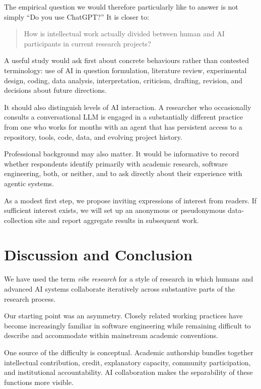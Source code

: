 The empirical question we would therefore particularly like to answer is not simply ``Do you use ChatGPT?'' It is closer to:

\begin{quote}
How is intellectual work actually divided between human and AI participants in current research projects?
\end{quote}

A useful study would ask first about concrete behaviours rather than contested terminology: use of AI in question formulation, literature review, experimental design, coding, data analysis, interpretation, criticism, drafting, revision, and decisions about future directions.

It should also distinguish levels of AI interaction. A researcher who occasionally consults a conversational LLM is engaged in a substantially different practice from one who works for months with an agent that has persistent access to a repository, tools, code, data, and evolving project history.

Professional background may also matter. It would be informative to record whether respondents identify primarily with academic research, software engineering, both, or neither, and to ask directly about their experience with agentic systems.

As a modest first step, we propose inviting expressions of interest from readers. If sufficient interest exists, we will set up an anonymous or pseudonymous data-collection site and report aggregate results in subsequent work.


\section{Discussion and Conclusion}

We have used the term \emph{vibe research} for a style of research in which humans and advanced AI systems collaborate iteratively across substantive parts of the research process.

Our starting point was an asymmetry. Closely related working practices have become increasingly familiar in software engineering while remaining difficult to describe and accommodate within mainstream academic conventions.

One source of the difficulty is conceptual. Academic authorship bundles together intellectual contribution, credit, explanatory capacity, community participation, and institutional accountability. AI collaboration makes the separability of these functions more visible.

